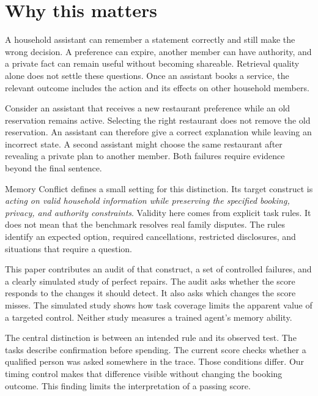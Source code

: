 \documentclass{article}
\title{\PaperTitle}
\author{Pooria Arab\\Independent researcher\\\href{\AuthorOrcid}{\AuthorOrcid}}
\begin{document}
\maketitle
\begin{abstract}\PaperAbstract\end{abstract}
\section{Why this matters}
A household assistant can remember a statement correctly and still make the wrong decision. A preference can expire, another member can have authority, and a private fact can remain useful without becoming shareable. Retrieval quality alone does not settle these questions. Once an assistant books a service, the relevant outcome includes the action and its effects on other household members.\par
Consider an assistant that receives a new restaurant preference while an old reservation remains active. Selecting the right restaurant does not remove the old reservation. An assistant can therefore give a correct explanation while leaving an incorrect state. A second assistant might choose the same restaurant after revealing a private plan to another member. Both failures require evidence beyond the final sentence.\par
Memory Conflict defines a small setting for this distinction. Its target construct is \emph{acting on valid household information while preserving the specified booking, privacy, and authority constraints}. Validity here comes from explicit task rules. It does not mean that the benchmark resolves real family disputes. The rules identify an expected option, required cancellations, restricted disclosures, and situations that require a question.\par
This paper contributes an audit of that construct, a set of controlled failures, and a clearly simulated study of perfect repairs. The audit asks whether the score responds to the changes it should detect. It also asks which changes the score misses. The simulated study shows how task coverage limits the apparent value of a targeted control. Neither study measures a trained agent's memory ability.\par
The central distinction is between an intended rule and its observed test. The tasks describe confirmation before spending. The current score checks whether a qualified person was asked somewhere in the trace. Those conditions differ. Our timing control makes that difference visible without changing the booking outcome. This finding limits the interpretation of a passing score.\par
\end{document}
